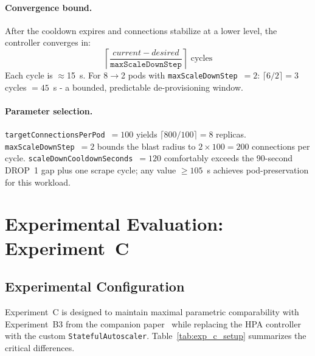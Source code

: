 \documentclass[3p,twocolumn]{elsarticle}
\theoremstyle{plain}%
\theoremstyle{definition}%
\begin{document}
\paragraph{Convergence bound.}
After the cooldown expires and connections stabilize at a lower level, the controller converges in:
\begin{equation}
\left\lceil \frac{current - desired}{\texttt{maxScaleDownStep}} \right\rceil \text{ cycles}
\label{eq:convergence}
\end{equation}
Each cycle is $\approx$15~s. For 8$\to$2 pods with \texttt{maxScaleDownStep}~$= 2$: $\lceil6/2\rceil = 3$ cycles $= 45$~s - a bounded, predictable de-provisioning window.

\paragraph{Parameter selection.}
\texttt{targetConnectionsPerPod}~$= 100$ yields $\lceil800/100\rceil = 8$ replicas. \texttt{maxScaleDownStep}~$= 2$ bounds the blast radius to $2 \times 100 = 200$ connections per cycle. \texttt{scaleDownCooldownSeconds}~$= 120$ comfortably exceeds the 90-second DROP~1 gap plus one scrape cycle; any value $\geq 105$~s achieves pod-preservation for this workload.



\section{Experimental Evaluation: Experiment~C}
\label{sec:evaluation}

\subsection{Experimental Configuration}

Experiment~C is designed to maintain maximal parametric comparability with Experiment~B3
from the companion paper~\cite{behera2026hpa} while replacing the HPA controller with the
custom \texttt{StatefulAutoscaler}. Table~\ref{tab:exp_c_setup} summarizes the critical
differences.
\end{document}
